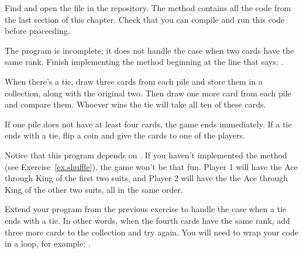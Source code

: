 \begin{exercise}  %

Find and open the file  in the repository.
The  method contains all the code from the last section of this chapter.
Check that you can compile and run this code before proceeding.

The program is incomplete; it does not handle the case when two cards have the same rank.
Finish implementing the  method beginning at the line that says: .

When there's a tie, draw three cards from each pile and store them in a collection, along with the original two.
Then draw one more card from each pile and compare them.
Whoever wins the tie will take all ten of these cards.

If one pile does not have at least four cards, the game ends immediately.
If a tie ends with a tie, flip a coin and give the cards to one of the players.

Notice that this program depends on .
If you haven't implemented the  method (see Exercise~\ref{ex.shuffle}), the game won't be that fun.
Player 1 will have the Ace through King of the first two suits, and Player 2 will have the the Ace through King of the other two suits, all in the same order.

\end{exercise}


\begin{exercise}  %

Extend your program from the previous exercise to handle the case when a tie ends with a tie.
In other words, when the fourth cards have the same rank, add three more cards to the collection and try again.
You will need to wrap your code in a loop, for example: .

\end{exercise}
